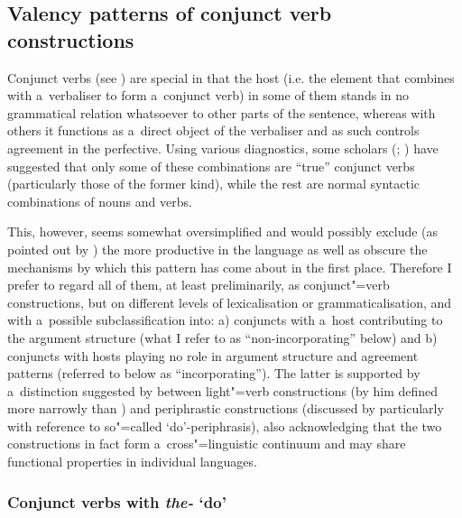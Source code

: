 \subsection{Valency patterns of conjunct verb constructions}
\label{subsec:12-2-8}

Conjunct verbs (see ) are special in that the host (i.e. the element that combines with a~verbaliser to form a~conjunct verb) in some of them stands in no grammatical relation whatsoever to other parts of the sentence, whereas with others it functions as a~direct object of the verbaliser and as such controls agreement in the perfective. Using various diagnostics, some scholars (\citealt[201]{verma1993}; \citealt[165]{mohanan1993}) have suggested that only some of these combinations are ``true'' conjunct verbs (particularly those of the former kind), while the rest are normal syntactic combinations of nouns and verbs. 



This, however, seems somewhat oversimplified and would possibly exclude (as pointed out by \citealt[160]{masica1993}) the more productive in the language as well as obscure the mechanisms by which this pattern has come about in the first place. Therefore I prefer to regard all of them, at least preliminarily, as conjunct"=verb constructions, but on different levels of lexicalisation or grammaticalisation, and with a~possible subclassification into: a) conjuncts with a~host contributing to the argument structure (what I refer to as ``non-incorporating'' below) and b) conjuncts with hosts playing no role in argument structure and agreement patterns (referred to below as ``incorporating''). The latter is supported by a~distinction suggested by \citet[69--74]{jaeger2006} between light"=verb constructions (by him defined more narrowly than \citealt{butt2010}) and periphrastic constructions (discussed by \citeauthor{jaeger2006} particularly with reference to so"=called `do'-periphrasis), also acknowledging that the two constructions in fact form a~cross"=linguistic continuum and may share functional properties in individual languages. 



\subsubsection*{Conjunct verbs with \textit{the-} `do'}

